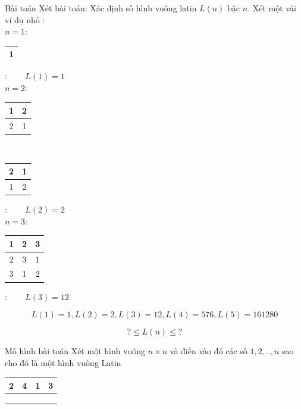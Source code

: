 \documentclass[notheorems,hyperref={bookmarks=true}]{beamer}
\theoremstyle{plain}
\begin{document}
\begin{footnotesize}
\begin{frame}{Bài toán}
Xét bài toán: Xác định số hình vuông latin $L(n)$ bậc $n$. Xét một vài ví dụ nhỏ :\\
$n=1$:
\begin{tabular}{|c|}
    \hline
     1 \\ \hline
    
\end{tabular}: ~~~ $L(1) = 1$
\vspace{20pt}
\\
$n=2$:
\begin{tabular}{|c|c|}
    \hline
     1&2 \\ \hline
     2&1 \\ 
     \hline
\end{tabular} ~~~~~~~~
\begin{tabular}{|c|c|}
    \hline
     2&1 \\ \hline
     1&2 \\ 
     \hline
\end{tabular}: ~~~ $L(2) = 2$
\vspace{20pt}
\\
$n=3$:
\begin{tabular}{|c|c|c|}
	\hline
	1&2&3 \\ \hline
	2&3&1 \\ \hline
	3&1&2 \\
	\hline
\end{tabular}: ~~~ $L(3) = 12$

\begin{equation*}
L(1) = 1, L(2) = 2, L(3) = 12, L(4) = 576, L(5) = 161280
\end{equation*}

\begin{equation*}
? \leq L(n) \leq ?
\end{equation*}
\end{frame}

\begin{frame}{Mô hình bài toán}
Xét một hình vuông $n \times n$ và điền vào đó các số $1,2,..,n$ sao cho đó là một hình vuông Latin

\begin{flushright}
\begin{tabular}{|c|c|c|c|}
	\hline
	2&4&1&3 \\ \hline
	&&& \\ \hline
	&&& \\ \hline
	&&& \\
	\hline
\end{tabular}
\end{flushright}


\end{frame}
\end{footnotesize}
\end{document}
